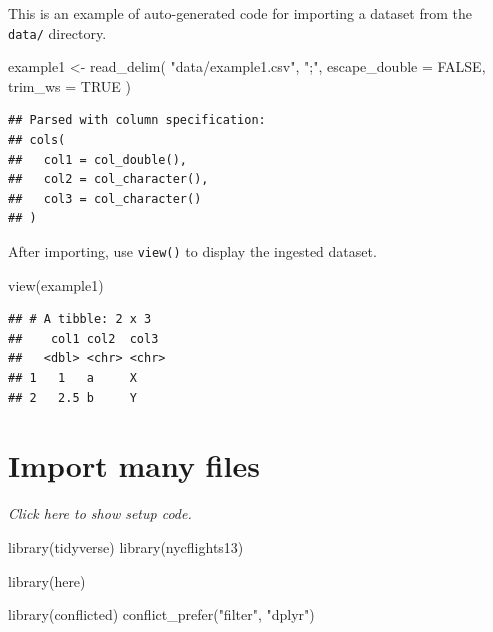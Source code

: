 \documentclass[]{book}
\newenvironment{Shaded}{}{}
\newcommand{\DataTypeTok}[1]{#1}
\newcommand{\KeywordTok}[1]{\textcolor[rgb]{0.00,0.00,1.00}{#1}}
\newcommand{\NormalTok}[1]{#1}
\newcommand{\OtherTok}[1]{\textcolor[rgb]{1.00,0.25,0.00}{#1}}
\newcommand{\StringTok}[1]{\textcolor[rgb]{0.00,0.50,0.50}{#1}}
\begin{document}
This is an example of auto-generated code for importing a dataset from the \texttt{data/} directory.

\begin{Shaded}
\begin{Highlighting}[]
\NormalTok{example1 <-}
\StringTok{  }\KeywordTok{read_delim}\NormalTok{(}
    \StringTok{"data/example1.csv"}\NormalTok{,}
    \StringTok{";"}\NormalTok{,}
    \DataTypeTok{escape_double =} \OtherTok{FALSE}\NormalTok{, }\DataTypeTok{trim_ws =} \OtherTok{TRUE}
\NormalTok{  )}
\end{Highlighting}
\end{Shaded}

\begin{verbatim}
## Parsed with column specification:
## cols(
##   col1 = col_double(),
##   col2 = col_character(),
##   col3 = col_character()
## )
\end{verbatim}

After importing, use \texttt{view()} to display the ingested dataset.

\begin{Shaded}
\begin{Highlighting}[]
\KeywordTok{view}\NormalTok{(example1)}
\end{Highlighting}
\end{Shaded}

\begin{verbatim}
## # A tibble: 2 x 3
##    col1 col2  col3 
##   <dbl> <chr> <chr>
## 1   1   a     X    
## 2   2.5 b     Y
\end{verbatim}

\hypertarget{import-many-files}{%
\section{Import many files}\label{import-many-files}}

\emph{Click here to show setup code.}

\begin{Shaded}
\begin{Highlighting}[]
\KeywordTok{library}\NormalTok{(tidyverse)}
\KeywordTok{library}\NormalTok{(nycflights13)}

\KeywordTok{library}\NormalTok{(here)}

\KeywordTok{library}\NormalTok{(conflicted)}
\KeywordTok{conflict_prefer}\NormalTok{(}\StringTok{"filter"}\NormalTok{, }\StringTok{"dplyr"}\NormalTok{)}
\end{Highlighting}
\end{Shaded}
\end{document}
